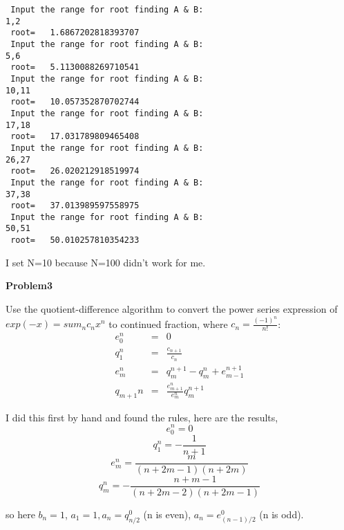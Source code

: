 \documentclass{article}
\begin{document}
\begin{verbatim}
 Input the range for root finding A & B:
1,2
 root=   1.6867202818393707     
 Input the range for root finding A & B:
5,6
 root=   5.1130088269710541     
 Input the range for root finding A & B:
10,11
 root=   10.057352870702744     
 Input the range for root finding A & B:
17,18
 root=   17.031789809465408     
 Input the range for root finding A & B:
26,27
 root=   26.020212918519974     
 Input the range for root finding A & B:
37,38
 root=   37.013989597558975     
 Input the range for root finding A & B:
50,51   
 root=   50.010257810354233   
\end{verbatim}
I set N=10 because N=100 didn't work for me.


\vskip 1cm

\textbf{Problem3}

Use the quotient-difference algorithm to convert the power series expression of $exp(-x)=sum_{n}c_nx^n$ to continued fraction, where $c_n=\frac{(-1)^n}{n!}$:
\begin{eqnarray*}
e_0^n&=&0\\
q_1^n&=&\frac{c_{n+1}}{c_n}\\
e_m^n&=&q_m^{n+1}-q_m^n+e_{m-1}^{n+1}\\
q_{m+1}{n}&=&\frac{e_{m+1}^n}{e_m^n}q_m^{n+1}
\end{eqnarray*}

I did this first by hand and found the rules, here are the results,
\[e_0^n=0\]
\[q_1^n=-\frac{1}{n+1}\]
\[e_m^n=\frac{m}{(n+2m-1)(n+2m)}\]
\[q_m^n=-\frac{n+m-1}{(n+2m-2)(n+2m-1)}\]

so here $b_n=1$, $a_1=1, a_n=q_{n/2}^0$ (n is even), $a_n=e_{(n-1)/2}^0$ (n is odd).
\end{document}

